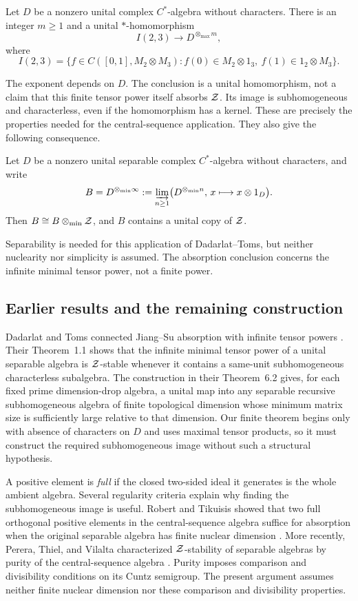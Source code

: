 \begin{theorem}\label{thm:finite}
Let $D$ be a nonzero unital complex $C^*$-algebra without characters. There
is an integer $m\ge1$ and a unital $*$-homomorphism
\[
 I(2,3)\longrightarrow D^{\otimes_{\max}m},
\]
where
\[
I(2,3)=\{f\in C([0,1],M_2\otimes M_3):
 f(0)\in M_2\otimes1_3,\ f(1)\in1_2\otimes M_3\}.
\]
\end{theorem}

The exponent depends on $D$. The conclusion is a unital homomorphism,
not a claim that this finite tensor power itself absorbs $\mathcal Z$.
Its image is subhomogeneous and characterless, even if the homomorphism
has a kernel. These are precisely the properties needed for the
central-sequence application. They also give the following consequence.

\begin{corollary}\label{cor:infinite-tensor}
Let $D$ be a nonzero unital separable complex $C^*$-algebra without
characters, and write
\[
 B=D^{\otimes_{\min}\infty}
 :=\varinjlim_{n\ge1}
 \bigl(D^{\otimes_{\min}n},\,x\longmapsto x\otimes1_D\bigr).
\]
Then $B\cong B\otimes_{\min}\mathcal Z$, and $B$ contains a unital copy of $\mathcal Z$.
\end{corollary}

Separability is needed for this application of Dadarlat--Toms, but neither
nuclearity nor simplicity is assumed. The absorption conclusion concerns
the infinite minimal tensor power, not a finite power.

\subsection{Earlier results and the remaining construction}

Dadarlat and Toms connected Jiang--Su absorption with infinite tensor
powers \cite{DT}. Their Theorem~1.1 shows that the infinite minimal
tensor power of a unital separable algebra is $\mathcal Z$-stable whenever
it contains a same-unit subhomogeneous characterless subalgebra. The
construction in their Theorem~6.2 gives, for each fixed prime
dimension-drop algebra, a unital map into any separable recursive
subhomogeneous algebra of finite topological dimension whose minimum
matrix size is sufficiently large relative to that dimension.
Our finite theorem begins only with absence of characters on $D$ and
uses maximal tensor products, so it must construct the required
subhomogeneous image without such a structural hypothesis.

A positive element is \emph{full} if the closed two-sided ideal it
generates is the whole ambient algebra. Several regularity criteria
explain why finding the subhomogeneous image is useful.
Robert and Tikuisis showed that two full orthogonal positive elements in
the central-sequence algebra suffice for absorption when the original
separable algebra has finite nuclear dimension \cite[Theorem~1.2]{RT}.
More recently, Perera, Thiel, and Vilalta characterized $\mathcal Z$-stability
of separable algebras by purity of the central-sequence algebra
\cite[Theorem~3.6]{PTV}.
Purity imposes comparison and divisibility conditions on its Cuntz
semigroup. The present argument assumes neither finite nuclear dimension
nor these comparison and divisibility properties.

